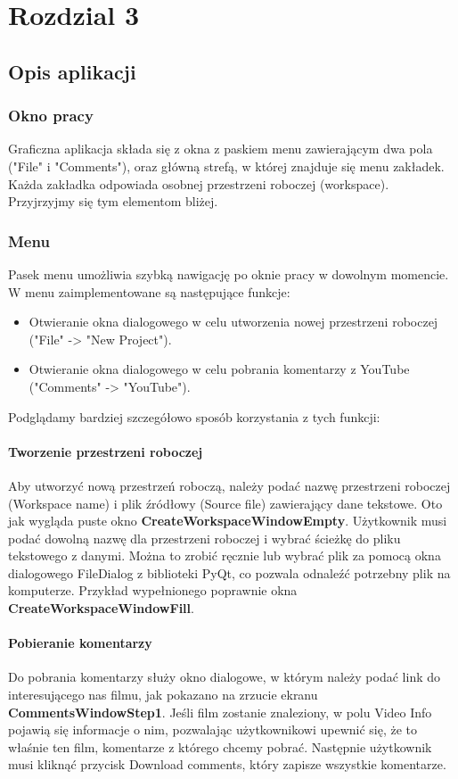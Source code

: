 \chapter{Rozdzial 3}

\section{Opis aplikacji}
	\subsection{Okno pracy}
		Graficzna aplikacja składa się z okna z paskiem menu zawierającym dwa pola ("File" i "Comments"), oraz główną strefą, w której znajduje się menu zakładek. Każda zakładka odpowiada osobnej przestrzeni roboczej (workspace). Przyjrzyjmy się tym elementom bliżej.

		
	\subsection{Menu}
		Pasek menu umożliwia szybką nawigację po oknie pracy w dowolnym momencie. W menu zaimplementowane są następujące funkcje:
		\begin{itemize}
			\item Otwieranie okna dialogowego w celu utworzenia nowej przestrzeni roboczej ("File" -> "New Project").
			\item Otwieranie okna dialogowego w celu pobrania komentarzy z YouTube ("Comments" -> "YouTube").
		\end{itemize}

		Podglądamy bardziej szczegółowo sposób korzystania z tych funkcji:

		
		\subsubsection{Tworzenie przestrzeni roboczej}
			Aby utworzyć nową przestrzeń roboczą, należy podać nazwę przestrzeni roboczej (Workspace name) i plik źródłowy (Source file) zawierający dane tekstowe. Oto jak wygląda puste okno \textbf{CreateWorkspaceWindowEmpty}. Użytkownik musi podać dowolną nazwę dla przestrzeni roboczej i wybrać ścieżkę do pliku tekstowego z danymi. Można to zrobić ręcznie lub wybrać plik za pomocą okna dialogowego FileDialog z biblioteki PyQt, co pozwala odnaleźć potrzebny plik na komputerze. Przykład wypełnionego poprawnie okna \textbf{CreateWorkspaceWindowFill}.

		
		\subsubsection{Pobieranie komentarzy}
			Do pobrania komentarzy służy okno dialogowe, w którym należy podać link do interesującego nas filmu, jak pokazano na zrzucie ekranu \textbf{CommentsWindowStep1}. Jeśli film zostanie znaleziony, w polu Video Info pojawią się informacje o nim, pozwalając użytkownikowi upewnić się, że to właśnie ten film, komentarze z którego chcemy pobrać. Następnie użytkownik musi kliknąć przycisk Download comments, który zapisze wszystkie komentarze.
		
